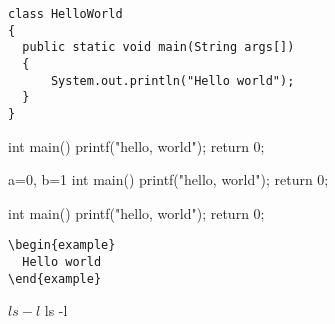 \documentclass{minimal}
\begin{document}
\begin{verbatim}
class HelloWorld
{
  public static void main(String args[])
  {
      System.out.println("Hello world");
  }
}
\end{verbatim}

\begin{cppcode}
int main() {
  printf("hello, world");
  return 0;
}
\end{cppcode}

\begin{cppcode*}{a=0,
	 b=1}
int main() {
  printf("hello, world");
  return 0;
}
\end{cppcode*}

\begin{cppcode_test}
int main() {
  printf("hello, world");
  return 0;
}
\end{cppcode_test}

\begin{verbatim}
\begin{example}
  Hello world
\end{example}
\end{verbatim}



\begin{longss}
$ ls -l
$ ls -l
\end{longss}
\end{document}
